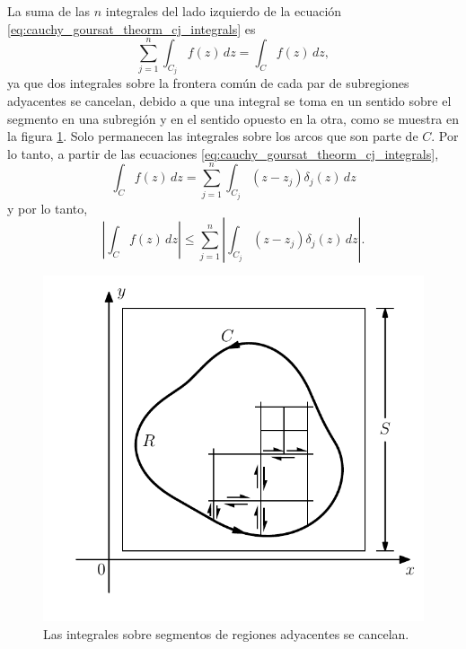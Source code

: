 \documentclass[a4paper]{report}
\begin{document}
La suma de las \(n\) integrales del lado izquierdo de la ecuación \ref{eq:cauchy_goursat_theorm_cj_integrals} es
\[
 \sum_{j=1}^n\int_{C_j}f(z)\,dz=\int_Cf(z)\,dz,
\]
ya que dos integrales sobre la frontera común de cada par de subregiones adyacentes se cancelan, debido a que una integral se toma en un sentido sobre el segmento en una subregión y en el sentido opuesto en la otra, como se muestra en la figura \ref{fig:cauchy_goursat_lemma_contours}. Solo permanecen las integrales sobre los arcos que son parte de \(C\). Por lo tanto, a partir de las ecuaciones \ref{eq:cauchy_goursat_theorm_cj_integrals},
\[
 \int_Cf(z)\,dz=\sum_{j=1}^n\int_{C_j}(z-z_j)\delta_j(z)\,dz
\]
y por lo tanto,
\begin{equation}\label{eq:cauchy_goursat_theorem_integral_bound}
 \left|\int_Cf(z)\,dz\right|\leq\sum_{j=1}^n\left|\int_{C_j}(z-z_j)\delta_j(z)\,dz\right|. 
\end{equation}
\begin{figure}[!htb]
  \begin{minipage}[c]{0.5\textwidth}
    \includegraphics[width=\textwidth]{figuras/cauchy_goursat_lemma_contours.pdf}
  \end{minipage}\hfill
  \begin{minipage}[c]{0.4\textwidth}
    \caption{
       Las integrales sobre segmentos de regiones adyacentes se cancelan.
    }\label{fig:cauchy_goursat_lemma_contours}
  \end{minipage}
\end{figure}
\end{document}
